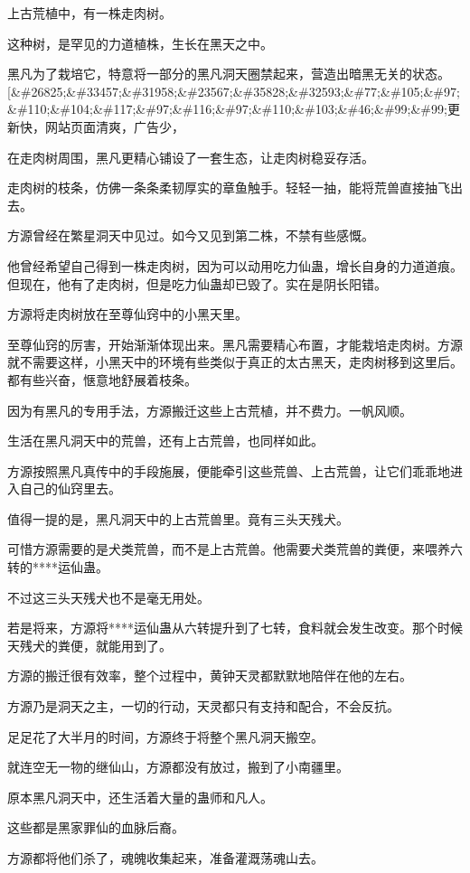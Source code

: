 \begin{this_body}
上古荒植中，有一株走肉树。

这种树，是罕见的力道植株，生长在黑天之中。

黑凡为了栽培它，特意将一部分的黑凡洞天圈禁起来，营造出暗黑无关的状态。[\&\#26825;\&\#33457;\&\#31958;\&\#23567;\&\#35828;\&\#32593;\&\#77;\&\#105;\&\#97;\&\#110;\&\#104;\&\#117;\&\#97;\&\#116;\&\#97;\&\#110;\&\#103;\&\#46;\&\#99;\&\#99;更新快，网站页面清爽，广告少，

在走肉树周围，黑凡更精心铺设了一套生态，让走肉树稳妥存活。

走肉树的枝条，仿佛一条条柔韧厚实的章鱼触手。轻轻一抽，能将荒兽直接抽飞出去。

方源曾经在繁星洞天中见过。如今又见到第二株，不禁有些感慨。

他曾经希望自己得到一株走肉树，因为可以动用吃力仙蛊，增长自身的力道道痕。但现在，他有了走肉树，但是吃力仙蛊却已毁了。实在是阴长阳错。

方源将走肉树放在至尊仙窍中的小黑天里。

至尊仙窍的厉害，开始渐渐体现出来。黑凡需要精心布置，才能栽培走肉树。方源就不需要这样，小黑天中的环境有些类似于真正的太古黑天，走肉树移到这里后。都有些兴奋，惬意地舒展着枝条。

因为有黑凡的专用手法，方源搬迁这些上古荒植，并不费力。一帆风顺。

生活在黑凡洞天中的荒兽，还有上古荒兽，也同样如此。

方源按照黑凡真传中的手段施展，便能牵引这些荒兽、上古荒兽，让它们乖乖地进入自己的仙窍里去。

值得一提的是，黑凡洞天中的上古荒兽里。竟有三头天残犬。

可惜方源需要的是犬类荒兽，而不是上古荒兽。他需要犬类荒兽的粪便，来喂养六转的****运仙蛊。

不过这三头天残犬也不是毫无用处。

若是将来，方源将****运仙蛊从六转提升到了七转，食料就会发生改变。那个时候天残犬的粪便，就能用到了。

方源的搬迁很有效率，整个过程中，黄钟天灵都默默地陪伴在他的左右。

方源乃是洞天之主，一切的行动，天灵都只有支持和配合，不会反抗。

足足花了大半月的时间，方源终于将整个黑凡洞天搬空。

就连空无一物的继仙山，方源都没有放过，搬到了小南疆里。

原本黑凡洞天中，还生活着大量的蛊师和凡人。

这些都是黑家罪仙的血脉后裔。

方源都将他们杀了，魂魄收集起来，准备灌溉荡魂山去。


\end{this_body}
